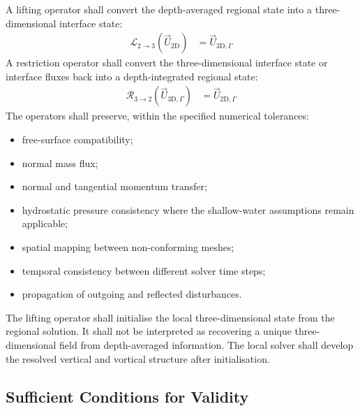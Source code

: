 
A lifting operator shall convert the depth-averaged regional state into a three-dimensional interface state:
\begin{align}
  \mathcal{L}_{2\rightarrow3} \left( \vec{U}_{\mathrm{2D}} \right) &= \vec{U}_{\mathrm{3D},\Gamma}
  \label{eq:res-mod-mul-lifting-operator}
\end{align}
A restriction operator shall convert the three-dimensional interface state or interface fluxes back into a depth-integrated regional state:
\begin{align}
  \mathcal{R}_{3\rightarrow2} \left( \vec{U}_{\mathrm{3D},\Gamma} \right) &= \vec{U}_{\mathrm{2D},\Gamma}
  \label{eq:res-mod-mul-restriction-operator}
\end{align}
The operators shall preserve, within the specified numerical tolerances:
\begin{itemize}
  \item free-surface compatibility;
  \item normal mass flux;
  \item normal and tangential momentum transfer;
  \item hydrostatic pressure consistency where the shallow-water assumptions remain applicable;
  \item spatial mapping between non-conforming meshes;
  \item temporal consistency between different solver time steps;
  \item propagation of outgoing and reflected disturbances.
\end{itemize}
The lifting operator shall initialise the local three-dimensional state from the regional solution. It shall not be interpreted as recovering a unique three-dimensional field from depth-averaged information. The local solver shall develop the resolved vertical and vortical structure after initialisation.

\subsection{Sufficient Conditions for Validity}
\label{sec:res-mod-mul-sufficient-conditions-validity}


